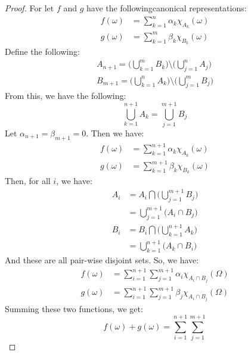     \begin{proof}
        For let $f$ and $g$ have the followingcanonical representations:
        \begin{align}
            f(\omega)&=\sum_{k=1}^{n}\alpha_{k}\chi_{A_{k}}(\omega)\\
            g(\omega)&=\sum_{k=1}^{m}\beta_{k}\chi_{B_{k}}(\omega)
        \end{align}
        Define the following:
        \begin{align}
            A_{n+1}=\Big(\bigcup_{k=1}^{m}B_{k}\Big)\setminus
                \Big(\bigcup_{j=1}^{n}A_{j}\Big)\\
            B_{m+1}=\Big(\bigcup_{k=1}^{n}A_{k}\Big)\setminus
                \Big(\bigcup_{j=1}^{m}B_{j}\Big)
        \end{align}
        From this, we have the following:
        \begin{equation}
            \bigcup_{k=1}^{n+1}A_{k}=\bigcup_{j=1}^{m+1}B_{j}
        \end{equation}
        Let $\alpha_{n+1}=\beta_{m+1}=0$. Then we have:
        \begin{align}
            f(\omega)&=\sum_{k=1}^{n+1}\alpha_{k}\chi_{A_{k}}(\omega)\\
            g(\omega)&=\sum_{k=1}^{m+1}\beta_{k}\chi_{B_{k}}(\omega)
        \end{align}
        Then, for all $i$, we have:
        \begin{align}
            A_{i}&=A_{i}\bigcap\Big(\bigcup_{j=1}^{m+1}B_{j}\Big)\\
            &=\bigcup_{j=1}^{m+1}\Big(A_{i}\cap{B}_{j}\Big)\\
            B_{i}&=B_{i}\bigcap\Big(\bigcup_{k=1}^{n+1}A_{k}\Big)\\
            &=\bigcup_{k=1}^{n+1}\Big(A_{k}\cap{B}_{i}\Big)
        \end{align}
        And these are all pair-wise disjoint sets. So, we have:
        \begin{align}
            f(\omega)&=\sum_{i=1}^{n+1}\sum_{j=1}^{m+1}\alpha_{i}
                \chi_{A_{i}\cap{B}_{j}}(\Omega)\\
            g(\omega)&=\sum_{i=1}^{n+1}\sum_{j=1}^{m+1}\beta_{j}
                \chi_{A_{i}\cap{B}_{j}}(\Omega)
        \end{align}
        Summing these two functions, we get:
        \begin{equation}
            f(\omega)+g(\omega)=\sum_{i=1}^{n+1}\sum_{j=1}^{m+1}

\end{equation}
\end{proof}
